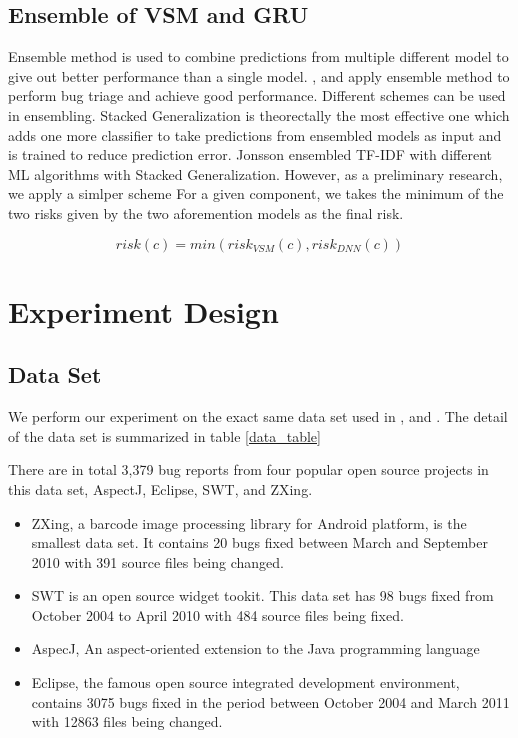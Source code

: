 \subsection{Ensemble of VSM and GRU}
Ensemble method \cite{dietterich2000ensemble} is used to combine predictions from multiple different model to give out better performance than a single model.	
\cite{lam2017bug} ,\cite{wang2014version} and \cite{jonsson2016automated} apply ensemble method to perform bug triage and achieve good performance. 
Different schemes can be used in ensembling. 
Stacked Generalization\cite{wolpert1992stacked} is theorectally the most effective one which adds one more classifier to take predictions from ensembled models as input and is trained to reduce prediction error.  
Jonsson \etal \cite{jonsson2016automated} ensembled TF-IDF with different ML algorithms with Stacked Generalization.
However, as a preliminary research, we apply a simlper scheme 
For a given component, we takes the minimum of the two risks given by the two aforemention models as the final risk.

\begin{equation}
risk(c) = min(risk_{VSM}(c) , risk_{DNN}(c) )
\end{equation}



 
\section{Experiment Design}

\subsection{Data Set }
We perform our experiment on the exact same data set used in \cite{wang2014version} ,\cite{saha2013improving} and \cite{zhou2012should}.
The detail of the data set is summarized in table \ref{data_table} 


There are in total 3,379 bug reports from four popular open source projects in this data set, AspectJ, Eclipse, SWT, and ZXing. 
\begin{itemize}
	\item ZXing, a barcode image processing library for Android platform, is the smallest data set.
	It contains 20 bugs fixed between March and September 2010 with 391 source files being changed.
	\item SWT is an open source widget tookit. 
	This data set has 98 bugs fixed from October 2004 to April 2010 with 484 source files being fixed. 
	\item AspecJ, An aspect-oriented extension to the Java programming language 
	\item Eclipse, the famous open source integrated development environment, contains 3075 bugs fixed in the period between October 2004 and March 2011 with 12863 files being changed.
\end{itemize}





